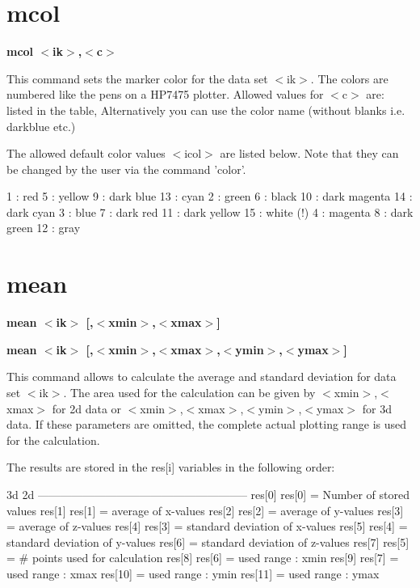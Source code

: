 \section{mcol}
{\bf mcol $ <$ik$> $,$ <$c$> $ \par }
\par
\vspace{3pt}
This command sets the marker color for the data set $ <$ik$> $. The colors 
are numbered like the pens on a HP7475 plotter. Allowed values for 
$ <$c$> $ are: listed in the table, Alternatively you can use 
the color name (without blanks i.e. darkblue etc.) 
\par
The allowed default color values $ <$icol$> $ are listed below. Note 
that they can be changed by the user via the command 'color'. 
\par
\begin{MacVerbatim}
  1 : red       5 : yellow        9 : dark blue      13 : cyan
  2 : green     6 : black        10 : dark magenta   14 : dark cyan
  3 : blue      7 : dark red     11 : dark yellow    15 : white (!)
  4 : magenta   8 : dark green   12 : gray
\end{MacVerbatim}
\section{mean}
{\bf mean $ <$ik$> $ [,$ <$xmin$> $,$ <$xmax$> $] \par }
{\bf mean $ <$ik$> $ [,$ <$xmin$> $,$ <$xmax$> $,$ <$ymin$> $,$ <$ymax$> $] \par }
\par
\vspace{3pt}
This command allows to calculate the average and standard deviation for data 
set $ <$ik$> $. The area used for the calculation can be given by $ <$xmin$> $,$ <$xmax$> $ for 
2d data or $ <$xmin$> $,$ <$xmax$> $,$ <$ymin$> $,$ <$ymax$> $ for 3d data. If these parameters are 
omitted, the complete actual plotting range is used for the calculation. 
\par
The results are stored in the res[i] variables in the following order: 
\par
\begin{MacVerbatim}
   3d        2d
  --------------------------------------------------------
  res[0]   res[0]   = Number of stored values
  res[1]   res[1]   = average of x-values
  res[2]   res[2]   = average of y-values
  res[3]            = average of z-values
  res[4]   res[3]   = standard deviation of x-values
  res[5]   res[4]   = standard deviation of y-values
  res[6]            = standard deviation of z-values
  res[7]   res[5]   = # points used for calculation
  res[8]   res[6]   = used range : xmin
  res[9]   res[7]   = used range : xmax
  res[10]           = used range : ymin
  res[11]           = used range : ymax
\end{MacVerbatim}
